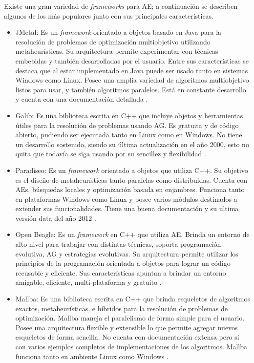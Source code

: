 Existe una gran variedad de \emph{frameworks} para AE; a continuación se describen algunos de los más populares junto con sus principales características.

\begin{itemize}
	\item JMetal: Es un \emph{framework} orientado a objetos basado en Java para la resolución de problemas de optimización multiobjetivo utilizando metaheurísticas. Su arquitectura permite experimentar con técnicas embebidas y también desarrolladas por el usuario. Entre sus características se destaca que al estar implementado en Java puede ser usado tanto en sistemas Windows como Linux. Posee una amplia variedad de algoritmos multiobjetivo listos para usar, y también algoritmos paralelos. Está en constante desarrollo y cuenta con una documentación detallada \citep{Jmetal}.
	
	\item Galib: Es una biblioteca escrita en C++ que incluye objetos y herramientas útiles para la resolución de problemas usando AG. Es gratuita y de código abierto, pudiendo ser ejecutada tanto en Linux como en Windows. No tiene un desarrollo sostenido, siendo su última actualización en el año 2000, esto no quita que todavía se siga usando por su sencillez y flexibilidad \citep{Galib}.
	
	\item Paradiseo: Es un \emph{framework} orientado a objetos que utiliza C++. Su objetivo es el diseño de metaheurísticas tanto paralelas como distribuidas. Cuenta con AEs, búsquedas locales y optimización basada en enjambres. Funciona tanto en plataformas Windows como Linux y posee varios módulos destinados a extender sus funcionalidades. Tiene una buena documentación y su ultima versión data del año 2012 \citep{Paradiseo}.
	
	\item Open Beagle: Es un \emph{framework} en C++ que utiliza AE. Brinda un entorno de alto nivel para trabajar con distintas técnicas, soporta programación evolutiva, AG y estrategias evolutivas. Su arquitectura permite utilizar los principios de la programación orientada a objetos para lograr un código recusable y eficiente. Sus características apuntan a brindar un entorno amigable, eficiente, multi-plataforma y gratuito \citep{OpenBeagle}.
	
	\item Mallba: Es una biblioteca escrita en C++ que brinda esqueletos de algoritmos exactos, metaheurísticas, e híbridos para la resolución de problemas de optimización. Mallba maneja el paralelismo de forma simple para el usuario. Posee una arquitectura flexible y extensible lo que permite agregar nuevos esqueletos de forma sencilla. No cuenta con documentación extensa pero si con varios ejemplos completos de implementaciones de los algoritmos. Mallba funciona tanto en ambiente Linux como Windows \citep{Mallba}.
	

\end{itemize}
